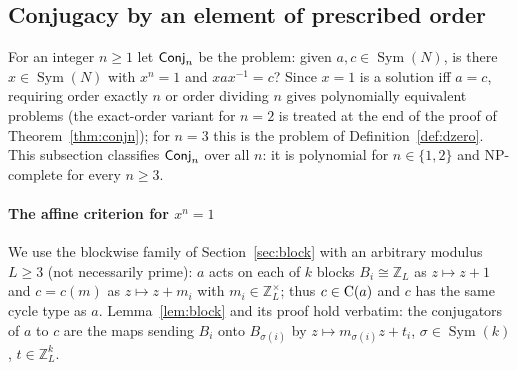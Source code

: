 \documentclass[preprint,12pt]{elsarticle}
\theoremstyle{definition}\newtheorem{defi}[thm]{Definition}\newtheorem{prob}[thm]{Problem}\newtheorem{obs}[thm]{Observation}
\theoremstyle{remark}\newtheorem{rem}[thm]{Remark}
\newcommand{\ZZ}{\mathbb Z}\newcommand{\Sym}{\operatorname{Sym}}\newcommand{\Alt}{\operatorname{Alt}}
\begin{document}
\subsection{Conjugacy by an element of prescribed order}\label{sec:conjn}
For an integer $n\ge1$ let $\mathsf{Conj}_{n}$ be the problem: given $a,c\in\Sym(N)$, is there $x\in\Sym(N)$ with $x^{n}=1$ and $xax^{-1}=c$?
Since $x=1$ is a solution iff $a=c$, requiring order exactly $n$ or order dividing $n$ gives polynomially equivalent problems (the exact-order
variant for $n=2$ is treated at the end of the proof of Theorem~\ref{thm:conjn}); for $n=3$ this is the problem of Definition~\ref{def:dzero}.
This subsection classifies $\mathsf{Conj}_{n}$ over all $n$: it is polynomial for $n\in\{1,2\}$ and NP-complete for every $n\ge3$.

\paragraph{The affine criterion for $x^{n}=1$}
We use the blockwise family of Section~\ref{sec:block} with an arbitrary modulus $L\ge3$ (not necessarily prime): $a$ acts on each of $k$
blocks $B_i\cong\ZZ_L$ as $z\mapsto z+1$ and $c=c(m)$ as $z\mapsto z+m_i$ with $m_i\in\ZZ_L^{\times}$; thus $c\in\operatorname{C}(a)$ and $c$ has the
same cycle type as $a$. Lemma~\ref{lem:block} and its proof hold verbatim: the conjugators of $a$ to $c$ are the maps sending $B_i$ onto
$B_{\sigma(i)}$ by $z\mapsto m_{\sigma(i)}z+t_i$, $\sigma\in\Sym(k)$, $t\in\ZZ_L^{k}$.
\end{document}

